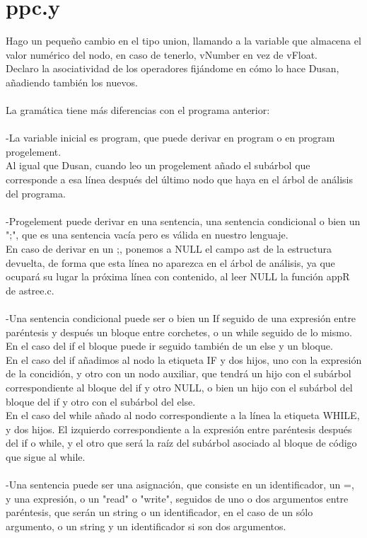 \documentclass{article}
\begin{document}
\section{ppc.y}
Hago un pequeño cambio en el tipo union, llamando a la variable que almacena el valor numérico del nodo, en caso de tenerlo, vNumber en vez de vFloat.\\
Declaro la asociatividad de los operadores fijándome en cómo lo hace Dusan, añadiendo también los nuevos.\\\\
La gramática tiene más diferencias con el programa anterior:\\\\
-La variable inicial es program, que puede derivar en program o en program progelement.\\
Al igual que Dusan, cuando leo un progelement añado el subárbol que corresponde a esa línea después del último nodo que haya en el árbol de análisis del programa.\\\\
-Progelement puede derivar en una sentencia, una sentencia condicional o bien un ";", que es una sentencia vacía pero es válida en nuestro lenguaje.\\
En caso de derivar en un ;, ponemos a NULL el campo ast de la estructura devuelta, de forma que esta línea no aparezca en el árbol de análisis, ya que ocupará su lugar la próxima línea con contenido, al leer NULL la función appR de astree.c.\\\\
-Una sentencia condicional puede ser o bien un If seguido de una expresión entre paréntesis y después un bloque entre corchetes, o un while seguido de lo mismo. En el caso del if el bloque puede ir seguido también de un else y un bloque.\\
En el caso del if añadimos al nodo la etiqueta IF y dos hijos, uno con la expresión de la concidión, y otro con un nodo auxiliar, que tendrá un hijo con el subárbol correspondiente al bloque del if y otro NULL, o bien un hijo con el subárbol del bloque del if y otro con el subárbol del else.\\
En el caso del while añado al nodo correspondiente a la línea la etiqueta WHILE, y dos hijos. El izquierdo correspondiente a la expresión entre paréntesis después del if o while, y el otro que será la raíz del subárbol asociado al bloque de código que sigue al while.\\\\ 
-Una sentencia puede ser una asignación, que consiste en un identificador, un =, y una expresión, o un "read" o "write", seguidos de uno o dos argumentos entre paréntesis, que serán un string o un identificador, en el caso de un sólo argumento, o un string y un identificador si son dos argumentos.\\
\end{document}
